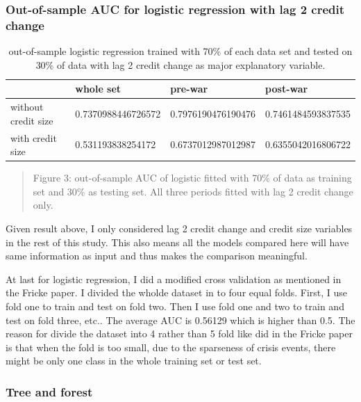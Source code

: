 \documentclass{article}
\newcommand{\ciapdf}[1]{\vspace*{-\parskip}\begin{center}\resizebox{0.75\textwidth}{!}{\texttt{[image: \#1]}}\end{center}}
\begin{document}
\subsubsection*{\centering{}Out-of-sample AUC for logistic regression with lag 2 credit change}

\begin{table}[H]
    \caption{out-of-sample logistic regression trained with 70\% of
    each data set and tested on 30\% of data with lag 2 credit change
    as major explanatory variable.
    }
    \begin{center}\begin{tabular}{|l|l|l|l|}
    \hline
                        & whole set          & pre-war            & post-war           \\ \hline
    without credit size & 0.7370988446726572 & 0.7976190476190476 & 0.7461484593837535 \\ \hline
    with credit size    & 0.531193838254172  & 0.6737012987012987 & 0.6355042016806722 \\ \hline
    \end{tabular}\end{center}
\end{table}

\ciapdf{Figure_4.pdf}
\begin{quote}
Figure 3: out-of-sample AUC of logistic fitted with 70\% of
data as training set and 30\% as testing set. All three periods
fitted with lag 2 credit change only.
\end{quote}

Given result above, I only considered lag 2 credit change and credit
size variables in the rest of this study. This also means all the models
compared here will have
same information as input and thus makes the comparison meaningful.

At last for logistic regression, I did a modified cross validation as
mentioned in the Fricke paper. I divided the wholde dataset in to four
equal folds. First, I use fold one to train and test on fold two. Then I
use fold one and two to train and test on fold three, etc.. The average
AUC is 0.56129 which is higher than 0.5. The reason for divide the
dataset into 4 rather than 5 fold like did in the Fricke paper is that
when the fold is too small, due to the sparseness of crisis events,
there might be only one class in the whole training set or test set.

\subsubsection*{Tree and forest}
\end{document}
